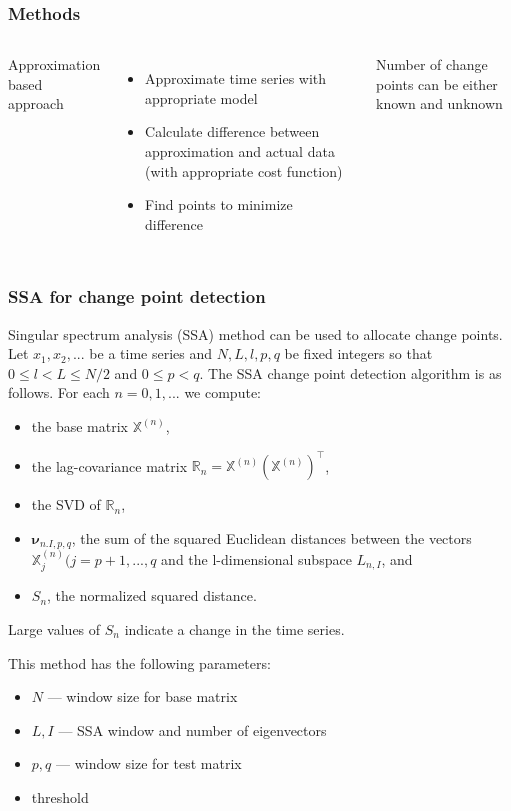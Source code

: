 \documentclass[intlimits, 9pt, unicode]{beamer}
\begin{document}
\begin{frame}
    \frametitle{Methods}

  \begin{columns}[T,onlytextwidth]
	Approximation based approach
	    \begin{itemize}
	    	\item Approximate time series with appropriate model
		\item Calculate difference between approximation and actual data (with appropriate cost function)
		\item Find points to minimize difference
	    \end{itemize}
	Number of change points can be either known and unknown

     \end{columns}

\end{frame}



\begin{frame}
    \frametitle{SSA for change point detection}

Singular spectrum analysis (SSA) method can be used to allocate change points.
Let $x_1,x_2,...$ be a time series and $N, L, l, p, q$ be fixed integers so that $0 \leq l < L \leq N/2$ and $ 0 \leq p < q$. The SSA change point detection algorithm is as follows.
For each $ n = 0,1,...$ we compute:
    \begin{itemize}
    	\item the base matrix $\mathbb{X}^{(n)}$,
	\item the lag-covariance matrix $\mathbb{R}_n = \mathbb{X}^{(n)}(\mathbb{X}^{(n)})^{\top}$,
	\item the SVD of $\mathbb{R}_n$,
	\item $\mathbf{\nu}_{n.I,p,q}$, the sum of the squared Euclidean distances between the vectors $\mathbb{X}_j^{(n)} (j = p+1,...,q$ and the l-dimensional subspace $L_{n,I}$, and
	\item $S_n$, the normalized squared distance.
    \end{itemize}
 Large values of $S_n$ indicate a change in the time series.

This method has the following parameters:
	\begin{itemize}
		\item $N$ --- window size for base matrix
		\item $L, I$ --- SSA window and number of eigenvectors
		\item $p, q$ --- window size for test matrix
		\item threshold
	\end{itemize}
\end{frame}
\end{document}
